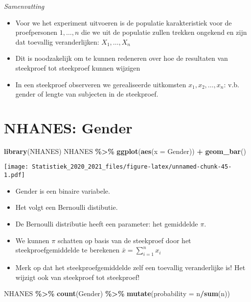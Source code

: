 \documentclass[
  12pt,dutch,coursenotes]{book}
\newenvironment{Shaded}{\begin{snugshade}}{\end{snugshade}}
\newcommand{\DataTypeTok}[1]{\textcolor[rgb]{0.13,0.29,0.53}{#1}}
\newcommand{\KeywordTok}[1]{\textcolor[rgb]{0.13,0.29,0.53}{\textbf{#1}}}
\newcommand{\NormalTok}[1]{#1}
\newcommand{\OperatorTok}[1]{\textcolor[rgb]{0.81,0.36,0.00}{\textbf{#1}}}
\newcommand{\StringTok}[1]{\textcolor[rgb]{0.31,0.60,0.02}{#1}}
\providecommand{\tightlist}{%
  \setlength{\itemsep}{0pt}\setlength{\parskip}{0pt}}
\theoremstyle{definition}
\theoremstyle{definition}
\theoremstyle{definition}
\theoremstyle{remark}
\begin{document}
\emph{Samenvatting}

\begin{itemize}
\item
  Voor we het experiment uitvoeren is de populatie karakteristiek voor de proefpersonen \(1,\ldots,n\) die we uit de populatie zullen trekken ongekend en zijn dat toevallig veranderlijken: \(X_1, \ldots, X_n\)
\item
  Dit is noodzakelijk om te kunnen redeneren over hoe de resultaten van steekproef tot steekproef kunnen wijzigen
\item
  In een steekproef observeren we gerealiseerde uitkomsten \(x_1, x_2, \dots, x_n\): v.b. gender of lengte van subjecten in de steekproef.
\end{itemize}

\hypertarget{nhanes-gender}{%
\section{NHANES: Gender}\label{nhanes-gender}}

\begin{Shaded}
\begin{Highlighting}[]
\KeywordTok{library}\NormalTok{(NHANES)}
\NormalTok{NHANES }\OperatorTok{\%\textgreater{}\%}\StringTok{ }\KeywordTok{ggplot}\NormalTok{(}\KeywordTok{aes}\NormalTok{(}\DataTypeTok{x =}\NormalTok{ Gender)) }\OperatorTok{+}\StringTok{ }\KeywordTok{geom\_bar}\NormalTok{()}
\end{Highlighting}
\end{Shaded}

\texttt{[image: Statistiek\_2020\_2021\_files/figure-latex/unnamed-chunk-45-1.pdf]}

\begin{itemize}
\tightlist
\item
  Gender is een binaire variabele.
\item
  Het volgt een Bernoulli distibutie.
\item
  De Bernoulli distributie heeft een parameter: het gemiddelde \(\pi\).
\item
  We kunnen \(\pi\) schatten op basis van de steekproef door het steekproefgemiddelde te berekenen \(\bar x = \sum\limits_{i=1}^n x_i\)
\item
  Merk op dat het steekproefgemiddelde zelf een toevallig veranderlijke is! Het wijzigt ook van steekproef tot steekproef!
\end{itemize}

\begin{Shaded}
\begin{Highlighting}[]
\NormalTok{NHANES }\OperatorTok{\%\textgreater{}\%}\StringTok{ }\KeywordTok{count}\NormalTok{(Gender) }\OperatorTok{\%\textgreater{}\%}\StringTok{ }\KeywordTok{mutate}\NormalTok{(}\DataTypeTok{probability =}\NormalTok{ n}\OperatorTok{/}\KeywordTok{sum}\NormalTok{(n))}
\end{Highlighting}
\end{Shaded}
\end{document}
